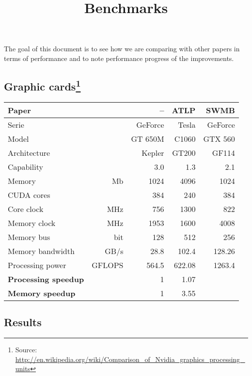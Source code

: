 

\title{Benchmarks}

\maketitle
\pagestyle{headings}

The goal of this document is to see how we are comparing with other papers in terms of performance and to note performance progress of the improvements.

\subsection*{Graphic cards\footnote{Source: \url{http://en.wikipedia.org/wiki/Comparison_of_Nvidia_graphics_processing_units}}}
\def\unt#1{& \footnotesize #1}
\begin{center}\begin{tabular}{lrrrr} \toprule
\bf Paper		&				& \bf -- 		& \bf  ATLP\cite{gpu_atlp} & \bf SWMB\cite{swat_mega} \\ \midrule
Serie		&				& GeForce	& Tesla	& GeForce  \\
Model		&				& GT 650M	& C1060	& GTX 560 \\
Architecture	&				& Kepler		& GT200	& GF114 \\
Capability		&				& 3.0		& 1.3	& 2.1 \\
Memory \unt{Mb}				& 1024		& 4096	& 1024 \\
CUDA cores &					& 384		& 240	& 384 \\
Core clock \unt{MHz}			& 756		& 1300	& 822 \\
Memory clock \unt{MHz}			& 1953		& 1600	& 4008 \\
Memory bus \unt{bit}				& 128		& 512	& 256 \\
Memory bandwidth \unt{GB/s}		& 28.8		& 102.4	& 128.26 \\
Processing power \unt{GFLOPS}	&564.5		& 622.08	& 1263.4 \\ \midrule
\bf Processing speedup & 		& 1			& 1.07	& \\
\bf Memory speedup & 			& 1			& 3.55	& \\ \bottomrule
\end{tabular}\end{center}

\subsection*{Results}
